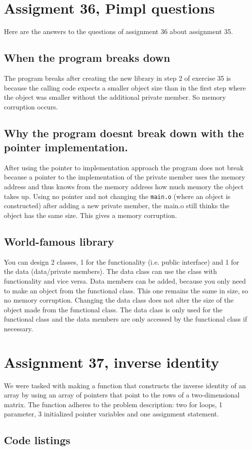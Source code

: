 \documentclass[11pt]{article}
\begin{document}
\section*{Assigment 36, Pimpl questions}
Here are the answers to the questions of assignment 36 about assignment 35.

\subsection*{When the program breaks down}
The program breaks after creating the new library in step 2 of exercise 35 is because the calling code expects a smaller object  size than in the first step where the object was smaller without the additional private member. So memory corruption occurs.

\subsection*{Why the program doesnt break down with the pointer implementation.}
After using the pointer to implementation approach the program does not break because a pointer to the implementation of the private member uses the memory address and thus knows from the memory address how much memory the object takes up. Using no pointer and not changing the \texttt{main.o} (where an object is constructed) after adding a new private member, the main.o still thinks the object has the same size. This gives a memory corruption.

\subsection*{World-famous library}
You can design 2 classes, 1 for the functionality (i.e. public interface) and 1 for the data (data/private members). The data class can use the class with functionality and vice versa. Data members can be added, because you only need to make an object from the functional class. This one remains the same in size, so no memory corruption. Changing the data class does not alter the size of the object made from the functional class. The data class is only used for the functional class and the data members are only accessed by the functional class if necessary.

\section*{Assignment 37, inverse identity}
We were tasked with making a function that constructs the inverse identity of an array by using an array of pointers that point to the rows of a two-dimensional matrix. The function adheres to the problem description: two for loops, 1 parameter, 3 initialized pointer variables and one assignment statement.

\subsection*{Code listings}



\end{document}
